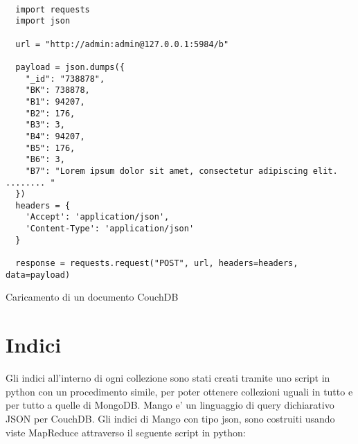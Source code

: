 \begin{listing}
  \begin{verbatim}
    
  import requests
  import json

  url = "http://admin:admin@127.0.0.1:5984/b"

  payload = json.dumps({
    "_id": "738878",
    "BK": 738878,
    "B1": 94207,
    "B2": 176,
    "B3": 3,
    "B4": 94207,
    "B5": 176,
    "B6": 3,
    "B7": "Lorem ipsum dolor sit amet, consectetur adipiscing elit. ........ " 
  })
  headers = {
    'Accept': 'application/json', 
    'Content-Type': 'application/json'
  }

  response = requests.request("POST", url, headers=headers, data=payload)
  \end{verbatim}
      \caption{Caricamento di un documento CouchDB}
\end{listing}

\section{Indici}

Gli indici all'interno di ogni collezione sono stati creati tramite uno script in python con un procedimento simile, per poter ottenere collezioni uguali in tutto e per tutto a 
quelle di MongoDB. 
Mango e' un linguaggio di query dichiarativo JSON per CouchDB. Gli indici di Mango con tipo json, sono costruiti usando viste MapReduce attraverso il seguente script in python:

